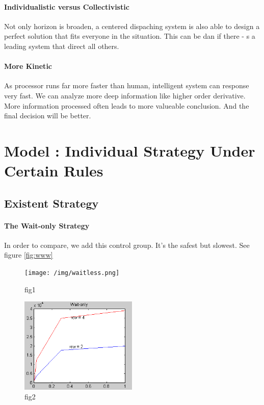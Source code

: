 \paragraph{Individualistic versus Collectivistic}
Not only horizon is broaden, a centered dispaching system is also able to design a perfect solution that fits everyone in the situation. This can be dan if there - s a leading system that direct all others. 

\paragraph{More Kinetic}
As processor runs far more faster than human, intelligent system can response very fast. 
We can analyze more deep information like higher order derivative. 
More information processed often leads to more valueable conclusion. 
And the final decision will be better. 

\section{Model \uppercase\expandafter{}: Individual Strategy Under Certain Rules}
\subsection{Existent Strategy}
\paragraph{The Wait-only Strategy}
In order to compare, we add this control group. 
It's the safest but slowest. 
See figure \ref{fig:www}
\begin{figure}
\begin{minipage}[t]{0.5\linewidth}
\centering
\texttt{[image: /img/waitless.png]}
\caption{fig1}
\label{fig:waitless}
\end{minipage}%
\begin{minipage}[t]{0.5\linewidth}
\centering
\includegraphics[width=2.2in]{./img/graphwait.png}
\caption{fig2}
\label{fig:graphwait}
\end{minipage}
\end{figure}
